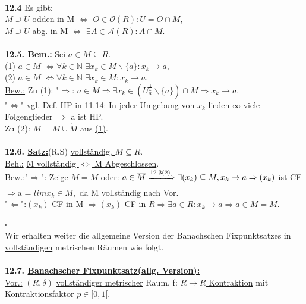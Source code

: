 \documentclass[]{scrartcl}
\begin{document}
	\\
	\textbf{12.4} Es gibt: \\
	$M\supseteq U$  \ul{odden in M} $\Leftrightarrow$ \ul{$O \in \mathcal{O}(R):U=O\cap M$},\\
	$M\supseteq U$ \ul{abg. in M} $\Leftrightarrow$ \ul{$\exists A \in \mathcal{A} (R):A\cap M$}.\\
	\\
	\textbf{12.5. \underline{Bem.:}} Sei $a\in M \subseteq R.$\\
	(1) \ul{$a\in \dot{M}$} $\Leftrightarrow \forall k \in \mathbb{N}$ \ul{$\exists x_k \in M \backslash\{a\}:x_k\rightarrow a$},\\
	(2) \ul{$a \in \overline{M}$} $\Leftrightarrow \forall k \in \mathbb{N}$ \ul{$\exists x_k \in M: x_k \rightarrow a$}.\\
	\underline{Bew.:} Zu (1): "$\Rightarrow$: $a \in \dot{M} \Rightarrow \exists x_k \in (U_a^{\frac{1}{k}}\backslash\{a\})\cap M \Rightarrow x_k\rightarrow a.$\\
	"$\Leftrightarrow$" vgl. Def. HP in \ul{11.14}: In jeder Umgebung von $x_k$ lieden $\infty$ viele Folgenglieder $\Rightarrow$ a ist HP.\\
	Zu (2): $\overline{M} = M\cup \dot{M}$ aus \ul{(1)}.\\
	\\
	\textbf{12.6. \underline{Satz:}}(R.S) \ul{vollständig, $M\subseteq R$}.\\
	\underline{Beh.:} \ul{M vollständig $\Leftrightarrow$ M Abgeschlossen}.\\
	\underline{Bew.:}"$\Rightarrow$": Zeige $M=\overline{M}$ oder: $a\in\overline{M} \xRightarrow{12.3(2)} \exists(x_k)\subseteq M, x_k \rightarrow a \Rightarrow (x_k)$ ist CF\\
	$\Rightarrow$a = $lim x_k \in M,$ da M vollständig nach Vor.\\
	"$\Leftarrow$":$(x_k)$ CF in M $\Rightarrow (x_k)$ CF in $R\Rightarrow \exists a \in R: x_k \rightarrow a \Rightarrow a\in \overline{M}=M.$\\
	\strut\hfill$\square$\\
	Wir erhalten weiter die allgemeine Version der Banachschen Fixpunktsatzes in \underline{vollständigen} metrischen Räumen wie folgt.\\
	\\
	\textbf{12.7. \ul{Banachscher Fixpunktsatz(allg. Version):}}\\
	\underline{Vor.:} $(R,\delta)$ \ul{vollständiger metrischer} Raum, f: \ul{$R\rightarrow R$ Kontraktion} mit Kontraktionsfaktor $p\in[0,1[.$\\
\end{document}
